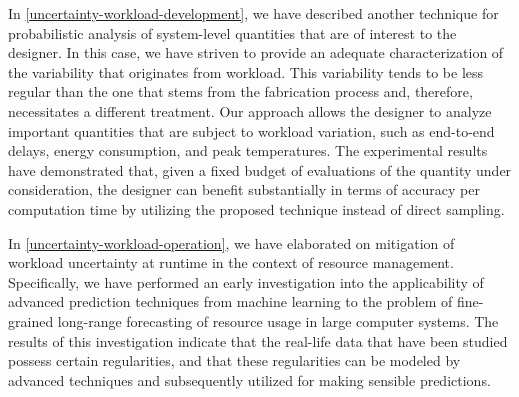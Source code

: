 In \cref{uncertainty-workload-development}, we have described another technique
for probabilistic analysis of system-level quantities that are of interest to
the designer. In this case, we have striven to provide an adequate
characterization of the variability that originates from workload. This
variability tends to be less regular than the one that stems from the
fabrication process and, therefore, necessitates a different treatment. Our
approach allows the designer to analyze important quantities that are subject to
workload variation, such as end-to-end delays, energy consumption, and peak
temperatures. The experimental results have demonstrated that, given a fixed
budget of evaluations of the quantity under consideration, the designer can
benefit substantially in terms of accuracy per computation time by utilizing the
proposed technique instead of direct sampling.

In \cref{uncertainty-workload-operation}, we have elaborated on mitigation of
workload uncertainty at runtime in the context of resource management.
Specifically, we have performed an early investigation into the applicability of
advanced prediction techniques from machine learning to the problem of
fine-grained long-range forecasting of resource usage in large computer systems.
The results of this investigation indicate that the real-life data that have
been studied possess certain regularities, and that these regularities can be
modeled by advanced techniques and subsequently utilized for making sensible
predictions.
